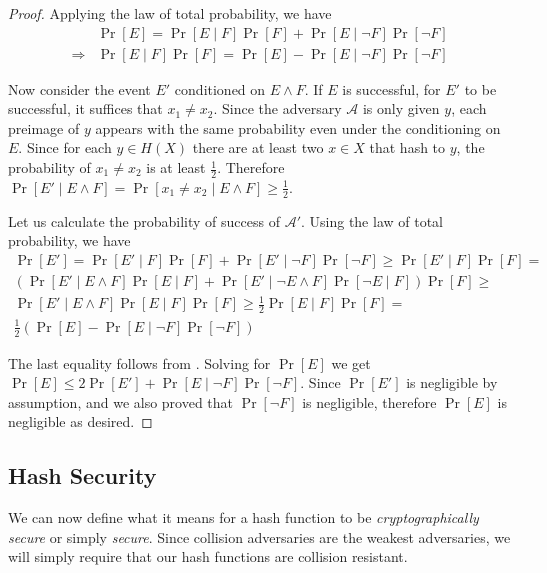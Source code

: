 \begin{proof}
  Applying the law of total probability, we have
  \begin{align}
                & \Pr[E] = \Pr[E \mid F] \Pr[F] + \Pr[E \mid \neg F] \Pr[\neg F] \nonumber \\
    \Rightarrow & \Pr[E \mid F]\Pr[F] = \Pr[E] - \Pr[E \mid \neg F] \Pr[\neg F] \label{eq.2preimage-preimage}
  \end{align}

  Now consider the event $E'$ conditioned on $E \land F$. If $E$ is successful, for $E'$ to be successful, it suffices that
  $x_1 \neq x_2$. Since the adversary $\mathcal{A}$ is only given $y$,
  each preimage of $y$ appears with the same probability even under the conditioning on $E$.
  Since for each $y \in H(X)$ there
  are at least two $x \in X$ that hash to $y$, the probability of $x_1 \neq x_2$ is at
  least $\frac{1}{2}$. Therefore
  $\Pr[E' \mid E \land F] = \Pr[x_1 \neq x_2 \mid E \land F] \geq \frac{1}{2}$.

  Let us calculate the probability of success of $\mathcal{A}'$. Using the law of total probability,
  we have
  \begin{align*}
    \Pr[E'] = \Pr[E' \mid F] \Pr[F] + \Pr[E' \mid \neg F] \Pr[\neg F] \geq
    \Pr[E' \mid F] \Pr[F] =\\
    \left(\Pr[E' \mid E \land F] \Pr[E \mid F]
    + \Pr[E' \mid \neg E \land F] \Pr[\neg E \mid F]\right) \Pr[F] \geq\\
    \Pr[E' \mid E \land F] \Pr[E \mid F] \Pr[F] \geq
    \frac{1}{2} \Pr[E \mid F] \Pr[F] = \\
    \frac{1}{2} \left(\Pr[E] - \Pr[E \mid \neg F] \Pr[\neg F]\right)
  \end{align*}

  The last equality follows from .
  Solving for $\Pr[E]$ we get $\Pr[E] \leq 2 \Pr[E'] + \Pr[E \mid \neg F] \Pr[\neg F]$.
  Since $\Pr[E']$ is negligible by assumption, and we also proved that $\Pr[\neg F]$ is negligible,
  therefore $\Pr[E]$ is negligible as desired.
\end{proof}

\subsection*{Hash Security}

We can now define what it means for a hash function to be \emph{cryptographically secure}
or simply \emph{secure}. Since collision adversaries are the weakest adversaries, we will
simply require that our hash functions are collision resistant.

